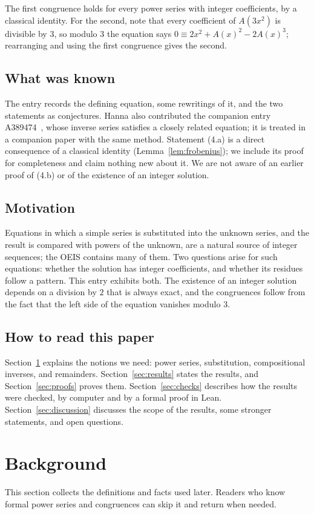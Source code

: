 \documentclass[11pt,a4paper]{article}
\theoremstyle{definition}
\theoremstyle{remark}
\begin{document}
The first congruence holds for every power series with integer coefficients, by a classical identity. For the second, note that every coefficient of $A(3x^2)$ is divisible by $3$, so modulo $3$ the equation says
$0\equiv2x^2+A(x)^2-2A(x)^3$; rearranging and using the first congruence gives the second.

\subsection{What was known}
The entry records the defining equation, some rewritings of it, and the two statements as conjectures. Hanna also
contributed the companion entry A389474~\cite{oeisother}, whose inverse series satisfies a closely related equation; it
is treated in a companion paper with the same method. Statement (4.a) is a direct consequence of a classical identity
(Lemma~\ref{lem:frobenius}); we include its proof for completeness and claim nothing new about it. We are not aware of
an earlier proof of (4.b) or of the existence of an integer solution.

\subsection{Motivation}
Equations in which a simple series is substituted into the unknown series, and the result is compared
with powers of the unknown, are a natural source of integer sequences; the OEIS contains many of them. Two questions
arise for such equations: whether the solution has integer coefficients, and whether its residues follow a pattern.
This entry exhibits both. The existence of an integer solution depends on a division by $2$ that is always
exact, and the congruences follow from the fact that the left side of the equation vanishes modulo $3$.

\subsection{How to read this paper}
Section~\ref{sec:background} explains the notions we need: power series, substitution, compositional inverses, and
remainders. Section~\ref{sec:results} states the results, and Section~\ref{sec:proofs} proves them.
Section~\ref{sec:checks} describes how the results were checked, by computer and by a formal proof in Lean.
Section~\ref{sec:discussion} discusses the scope of the results, some stronger statements, and open questions.
\section{Background}\label{sec:background}
This section collects the definitions and facts used later. Readers who know formal power series and congruences can skip it and return when needed.
\end{document}
